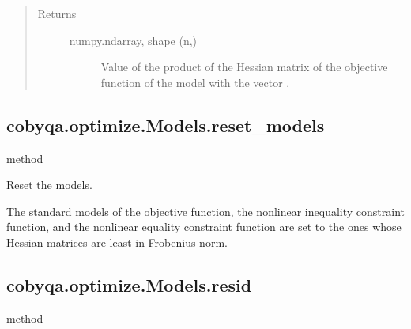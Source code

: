 \documentclass[letterpaper,10pt,english]{sphinxmanual}
\begin{document}
\begin{fulllineitems}
\begin{fulllineitems}
\begin{quote}
\begin{description}
\begin{description}
\end{description}

\item[{Returns}] \leavevmode\begin{description}
\item[{numpy.ndarray, shape (n,)}] \leavevmode
\sphinxAtStartPar
Value of the product of the Hessian matrix of the objective function
of the model with the vector .

\end{description}

\end{description}\end{quote}

\end{fulllineitems}



\subsection{cobyqa.optimize.Models.reset\_models}
\label{\detokenize{refs/generated/cobyqa.optimize.Models.reset_models:cobyqa-optimize-models-reset-models}}\label{\detokenize{refs/generated/cobyqa.optimize.Models.reset_models::doc}}
\sphinxAtStartPar
method

\begin{fulllineitems}
\label{\detokenize{refs/generated/cobyqa.optimize.Models.reset_models:cobyqa.optimize.Models.reset_models}}
\sphinxAtStartPar
Reset the models.

\sphinxAtStartPar
The standard models of the objective function, the nonlinear inequality
constraint function, and the nonlinear equality constraint function are
set to the ones whose Hessian matrices are least in Frobenius norm.

\end{fulllineitems}



\subsection{cobyqa.optimize.Models.resid}
\label{\detokenize{refs/generated/cobyqa.optimize.Models.resid:cobyqa-optimize-models-resid}}\label{\detokenize{refs/generated/cobyqa.optimize.Models.resid::doc}}
\sphinxAtStartPar
method


\end{fulllineitems}
\end{document}
